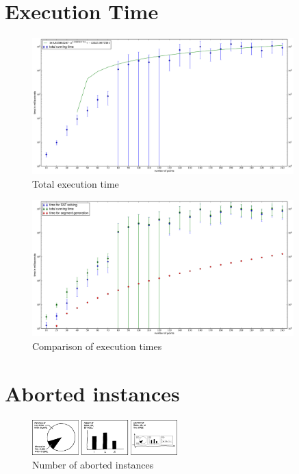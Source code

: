 \section{Execution Time}

\begin{figure}[ht]
  \centering
  \includegraphics[width=0.9\textwidth]{results/time_total.pdf}
  \caption{Total execution time\label{fig:total_time}}
\end{figure}

\begin{figure}[ht]
  \centering
  \includegraphics[width=0.9\textwidth]{results/time_comparison.pdf}
  \caption{Comparison of execution times\label{fig:times}}
\end{figure}

\section{Aborted instances}

\begin{figure}[ht]
  \centering
  \includegraphics[width=0.5\textwidth]{img/self_description.png}
  \caption{Number of aborted instances\label{fig:aborted}}
\end{figure}

